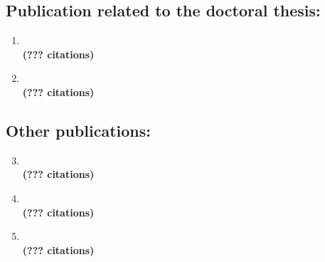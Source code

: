 \documentclass[12pt, a4paper]{book}
\begin{document}


\ListOfPublications{}

\subsection*{Publication related to the doctoral thesis:}

\begin{enumerate}
  \item {} \\
  \textbf{(??? citations)}
  \item {} \\
  \textbf{(??? citations)}
\end{enumerate}

\subsection*{Other publications:}

\begin{enumerate}
  \setcounter{enumi}{2}
  \item {} \\
  \textbf{(??? citations)}
  \item {} \\
  \textbf{(??? citations)}
  \item {} \\
  \textbf{(??? citations)}
\end{enumerate}

\clearpage
\end{document}
